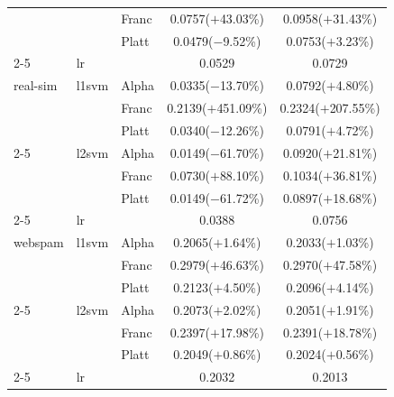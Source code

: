 \begin{tabular}{@{}lllcc@{}}
 &  & Franc & 0.0757($+$43.03\%) & 0.0958($+$31.43\%) \\
 &  & Platt & 0.0479($-$9.52\%) & 0.0753($+$3.23\%) \\
\cline{2-5}
 & lr &  & 0.0529 & 0.0729 \\
\hline
real-sim & l1svm & Alpha & 0.0335($-$13.70\%) & 0.0792($+$4.80\%) \\
 &  & Franc & 0.2139($+$451.09\%) & 0.2324($+$207.55\%) \\
 &  & Platt & 0.0340($-$12.26\%) & 0.0791($+$4.72\%) \\
\cline{2-5}
 & l2svm & Alpha & 0.0149($-$61.70\%) & 0.0920($+$21.81\%) \\
 &  & Franc & 0.0730($+$88.10\%) & 0.1034($+$36.81\%) \\
 &  & Platt & 0.0149($-$61.72\%) & 0.0897($+$18.68\%) \\
\cline{2-5}
 & lr &  & 0.0388 & 0.0756 \\
\hline
webspam & l1svm & Alpha & 0.2065($+$1.64\%) & 0.2033($+$1.03\%) \\
 &  & Franc & 0.2979($+$46.63\%) & 0.2970($+$47.58\%) \\
 &  & Platt & 0.2123($+$4.50\%) & 0.2096($+$4.14\%) \\
\cline{2-5}
 & l2svm & Alpha & 0.2073($+$2.02\%) & 0.2051($+$1.91\%) \\
 &  & Franc & 0.2397($+$17.98\%) & 0.2391($+$18.78\%) \\
 &  & Platt & 0.2049($+$0.86\%) & 0.2024($+$0.56\%) \\
\cline{2-5}
 & lr &  & 0.2032 & 0.2013 \\
\hline
\end{tabular}
